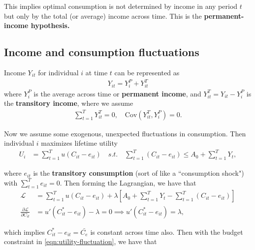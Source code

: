 \documentclass{article}
\newcommand{\cov}[1]{\mathrm{Cov}\left(#1\right)}
\renewcommand{\L}{\mathcal{L}}
\begin{document}
        This implies optimal consumption is not determined by income in any period $t$ but only by the total (or average) income across time. This is the \textbf{permanent-income hypothesis.}
    
    \subsection{Income and consumption fluctuations}
        
        Income $Y_{it}$ for individual $i$ at time $t$ can be represented as
        \begin{align}
            Y_{it} = Y_{i}^P + Y_{it}^T
            \label{eqn:income-fluctuation}
        \end{align}
        where $Y_{i}^P$ is the average across time or \textbf{permanent income}, and $Y_{it}^T = Y_{it} - Y_{i}^P$ is the \textbf{transitory income}, where we assume
        \begin{align}
            \sum_{t=1}^T Y_{it}^T = 0,\quad
            \cov{Y_{it}^T, Y_{i}^P} = 0.
        \end{align}
        
        Now we assume some exogenous, unexpected fluctuations in consumption. Then individual $i$ maximizes lifetime utility
        \begin{align}
            U_i &= \sum_{t=1}^T u\left(C_{it} - e_{it}\right)
             \quad s.t. \quad
            \sum_{t=1}^T \left(C_{it} - e_{it}\right) \le A_0 + \sum_{t=1}^T Y_t,
            \label{eqn:utility-fluctuation}
        \end{align}
        
        where $e_{it}$ is the \textbf{transitory consumption} (sort of like a ``consumption shock") with $\sum_{t=1}^T e_{it} = 0$. Then forming the Lagrangian, we have that
        \begin{align}
            \L
            &=
            \sum_{t=1}^T u\left(C_{it} - e_{it}\right)
            + \lambda \left[A_0 + \sum_{t=1}^T Y_t - \sum_{t=1}^T \left(C_{it} - e_{it}\right)\right]
            \\
            \frac{\partial \L}{\partial C_{it}}
            &= u'\left(C_{it}^* - e_{it}\right) - \lambda = 0
            \implies u'\left(C_{it}^* - e_{it}\right) = \lambda,
        \end{align}
        
        which implies $C_{it}^* - e_{it} = \bar{C_e}$ is constant across time also. Then with the budget constraint in \eqref{eqn:utility-fluctuation}, we have that
        
\end{document}
